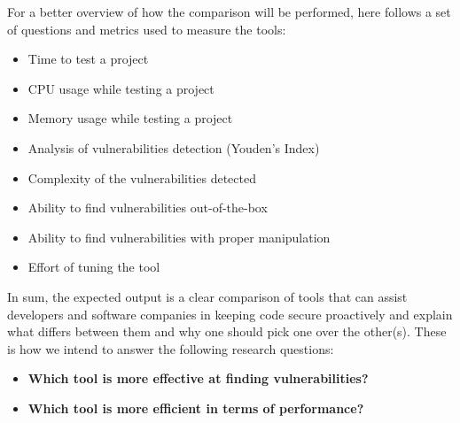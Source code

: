 For a better overview of how the comparison will be performed, here follows a set of questions and metrics used to measure the tools:
\begin{itemize}
    \item Time to test a project
    \item CPU usage while testing a project
    \item Memory usage while testing a project
    \item Analysis of vulnerabilities detection (Youden's Index)
    \item Complexity of the vulnerabilities detected
    \item Ability to find vulnerabilities out-of-the-box
    \item Ability to find vulnerabilities with proper manipulation
    \item Effort of tuning the tool
\end{itemize}

In sum, the expected output is a clear comparison of tools that can assist developers and software companies in keeping code secure proactively and explain what differs between them and why one should pick one over the other(s). These is how we intend to answer the following research questions:

\begin{itemize}
    \item \textbf{Which tool is more effective at finding vulnerabilities?}
    \item \textbf{Which tool is more efficient in terms of performance?}
\end{itemize}



